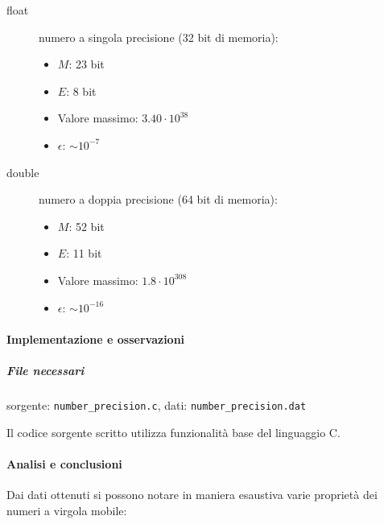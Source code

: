 \begin{description}
	\item[float] numero a singola precisione (32 bit di memoria):
		\begin{itemize}
			\item $M$: 23 bit
			\item $E$: 8 bit
			\item Valore massimo: $3.40 \cdot 10^{38}$
			\item $\epsilon$: $\sim 10^{-7}$
		\end{itemize}
	\item[double] numero a doppia precisione (64 bit di memoria):
		\begin{itemize}
			\item $M$: 52 bit
			\item $E$: 11 bit
			\item Valore massimo: $1.8 \cdot 10^{308}$
			\item $\epsilon$: $\sim 10^{-16}$
		\end{itemize}

\end{description}


\paragraph{Implementazione e osservazioni}

\subparagraph{File necessari} sorgente: \texttt{number\_precision.c}, dati: \texttt{number\_precision.dat}

Il codice sorgente scritto utilizza funzionalità base del linguaggio C. 

\paragraph{Analisi e conclusioni}

Dai dati ottenuti si possono notare in maniera esaustiva varie proprietà dei
numeri a virgola mobile:

